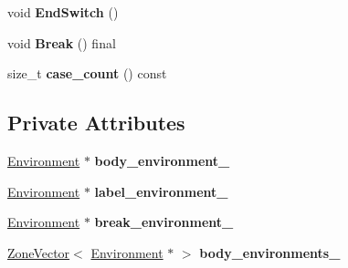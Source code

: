 \begin{DoxyCompactItemize}
\item 
void {\bfseries End\+Switch} ()\hypertarget{classv8_1_1internal_1_1compiler_1_1_switch_builder_abdfd6efe1c749a9380884538deb7ff75}{}\label{classv8_1_1internal_1_1compiler_1_1_switch_builder_abdfd6efe1c749a9380884538deb7ff75}

\item 
void {\bfseries Break} () final\hypertarget{classv8_1_1internal_1_1compiler_1_1_switch_builder_a184d8f104ea394e23174ff0694b1045f}{}\label{classv8_1_1internal_1_1compiler_1_1_switch_builder_a184d8f104ea394e23174ff0694b1045f}

\item 
size\+\_\+t {\bfseries case\+\_\+count} () const \hypertarget{classv8_1_1internal_1_1compiler_1_1_switch_builder_a408e79366341af127111b3814d5f0930}{}\label{classv8_1_1internal_1_1compiler_1_1_switch_builder_a408e79366341af127111b3814d5f0930}

\end{DoxyCompactItemize}
\subsection*{Private Attributes}
\begin{DoxyCompactItemize}
\item 
\hyperlink{classv8_1_1internal_1_1compiler_1_1_ast_graph_builder_1_1_environment}{Environment} $\ast$ {\bfseries body\+\_\+environment\+\_\+}\hypertarget{classv8_1_1internal_1_1compiler_1_1_switch_builder_ab19051abc72c33ae82c452789391d095}{}\label{classv8_1_1internal_1_1compiler_1_1_switch_builder_ab19051abc72c33ae82c452789391d095}

\item 
\hyperlink{classv8_1_1internal_1_1compiler_1_1_ast_graph_builder_1_1_environment}{Environment} $\ast$ {\bfseries label\+\_\+environment\+\_\+}\hypertarget{classv8_1_1internal_1_1compiler_1_1_switch_builder_a193e6887230eca1ab7e571f2b582ad5c}{}\label{classv8_1_1internal_1_1compiler_1_1_switch_builder_a193e6887230eca1ab7e571f2b582ad5c}

\item 
\hyperlink{classv8_1_1internal_1_1compiler_1_1_ast_graph_builder_1_1_environment}{Environment} $\ast$ {\bfseries break\+\_\+environment\+\_\+}\hypertarget{classv8_1_1internal_1_1compiler_1_1_switch_builder_afa2fcff261643c9ae45d068c8b14d6ca}{}\label{classv8_1_1internal_1_1compiler_1_1_switch_builder_afa2fcff261643c9ae45d068c8b14d6ca}

\item 
\hyperlink{classv8_1_1internal_1_1_zone_vector}{Zone\+Vector}$<$ \hyperlink{classv8_1_1internal_1_1compiler_1_1_ast_graph_builder_1_1_environment}{Environment} $\ast$ $>$ {\bfseries body\+\_\+environments\+\_\+}\hypertarget{classv8_1_1internal_1_1compiler_1_1_switch_builder_a48b7a83a82e261c0977da8519fa06728}{}\label{classv8_1_1internal_1_1compiler_1_1_switch_builder_a48b7a83a82e261c0977da8519fa06728}

\end{DoxyCompactItemize}
